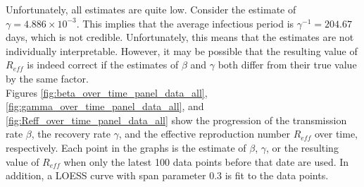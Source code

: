 \documentclass[12pt]{article}
\begin{document}
\begin{appendices}
    	Unfortunately, all estimates are quite low. Consider the estimate of $\gamma = 4.886 \times 10^{-3}$. This implies that the average infectious period is $\gamma^{-1} = 204.67$ days, which is not credible. Unfortunately, this means that the estimates are not individually interpretable. However, it may be possible that the resulting value of $R_{eff}$ is indeed correct if the estimates of $\beta$ and $\gamma$ both differ from their true value by the same factor. \\
		
		Figures \ref{fig:beta_over_time_panel_data_all}, \ref{fig:gamma_over_time_panel_data_all}, and \ref{fig:Reff_over_time_panel_data_all} show the progression of the transmission rate $\beta$, the recovery rate $\gamma$, and the effective reproduction number $R_{eff}$ over time, respectively. Each point in the graphs is the estimate of $\beta$, $\gamma$, or the resulting value of $R_{eff}$ when only the latest 100 data points before that date are used. In addition, a LOESS curve with span parameter 0.3 is fit to the data points.
		

\end{appendices}
\end{document}
